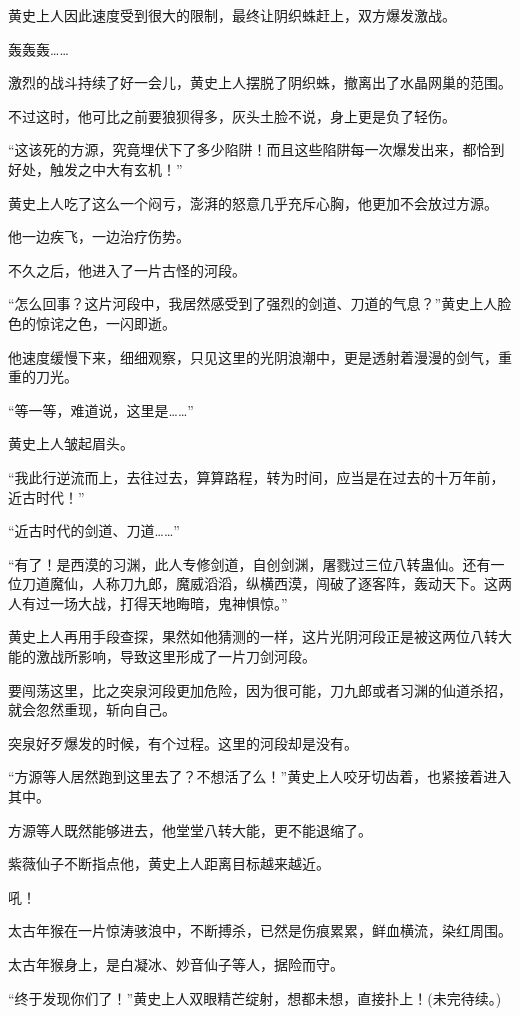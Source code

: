 \begin{this_body}
黄史上人因此速度受到很大的限制，最终让阴织蛛赶上，双方爆发激战。

轰轰轰……

激烈的战斗持续了好一会儿，黄史上人摆脱了阴织蛛，撤离出了水晶网巢的范围。

不过这时，他可比之前要狼狈得多，灰头土脸不说，身上更是负了轻伤。

“这该死的方源，究竟埋伏下了多少陷阱！而且这些陷阱每一次爆发出来，都恰到好处，触发之中大有玄机！”

黄史上人吃了这么一个闷亏，澎湃的怒意几乎充斥心胸，他更加不会放过方源。

他一边疾飞，一边治疗伤势。

不久之后，他进入了一片古怪的河段。

“怎么回事？这片河段中，我居然感受到了强烈的剑道、刀道的气息？”黄史上人脸色的惊诧之色，一闪即逝。

他速度缓慢下来，细细观察，只见这里的光阴浪潮中，更是透射着漫漫的剑气，重重的刀光。

“等一等，难道说，这里是……”

黄史上人皱起眉头。

“我此行逆流而上，去往过去，算算路程，转为时间，应当是在过去的十万年前，近古时代！”

“近古时代的剑道、刀道……”

“有了！是西漠的习渊，此人专修剑道，自创剑渊，屠戮过三位八转蛊仙。还有一位刀道魔仙，人称刀九郎，魔威滔滔，纵横西漠，闯破了逐客阵，轰动天下。这两人有过一场大战，打得天地晦暗，鬼神惧惊。”

黄史上人再用手段查探，果然如他猜测的一样，这片光阴河段正是被这两位八转大能的激战所影响，导致这里形成了一片刀剑河段。

要闯荡这里，比之突泉河段更加危险，因为很可能，刀九郎或者习渊的仙道杀招，就会忽然重现，斩向自己。

突泉好歹爆发的时候，有个过程。这里的河段却是没有。

“方源等人居然跑到这里去了？不想活了么！”黄史上人咬牙切齿着，也紧接着进入其中。

方源等人既然能够进去，他堂堂八转大能，更不能退缩了。

紫薇仙子不断指点他，黄史上人距离目标越来越近。

吼！

太古年猴在一片惊涛骇浪中，不断搏杀，已然是伤痕累累，鲜血横流，染红周围。

太古年猴身上，是白凝冰、妙音仙子等人，据险而守。

“终于发现你们了！”黄史上人双眼精芒绽射，想都未想，直接扑上！(未完待续。)

\end{this_body}

